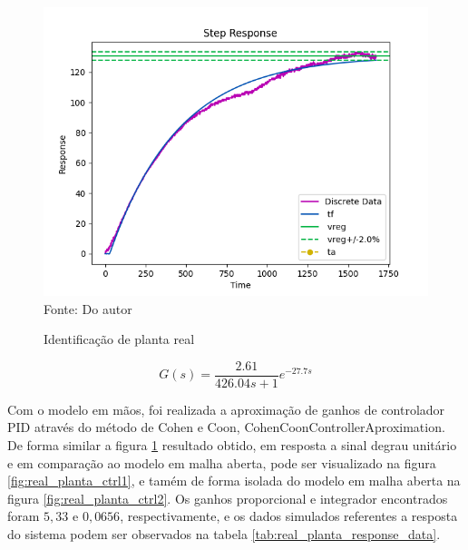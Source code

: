 \begin{figure}[H]
    \centering
    \caption{Identificação de planta real}
    \includegraphics[scale=0.8]{figuras/real_planta_ident}
    \label{fig:real_planta_ident}
    \\
    \vspace{0cm}\hspace{0cm}\small{Fonte: Do autor}
\end{figure}

\begin{equation}
    \label{eq:real_planta_model}
    G(s) = \frac{2.61}{426.04 s + 1}e^{-27.7 s}
\end{equation}

Com o modelo em mãos, foi realizada a aproximação de ganhos de controlador PID através do método de Cohen e Coon,
CohenCoonControllerAproximation.
De forma similar a figura \ref{fig:real_planta_ident} resultado obtido, em resposta a sinal degrau unitário e em
comparação ao modelo em malha aberta, pode ser visualizado
na figura \ref{fig:real_planta_ctrl1}, e tamém de forma isolada do modelo em malha aberta na figura
\ref{fig:real_planta_ctrl2}.
Os ganhos proporcional e integrador encontrados foram $5,33$ e $0,0656$, respectivamente, e os
dados simulados referentes a resposta do sistema podem ser observados na tabela \ref{tab:real_planta_response_data}.

